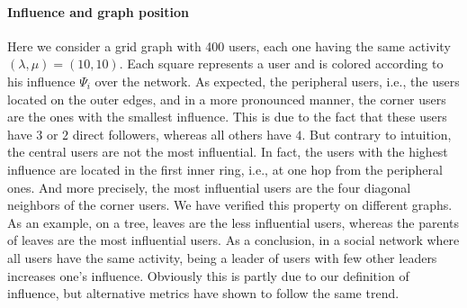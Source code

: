 \documentclass[10pt, conference, letterpaper]{IEEEtran}
\begin{document}
{\paragraph{Influence and graph position}
Here we consider a grid graph with 400 users, each one having the same activity $\left(\lambda, \mu\right) = \left(10, 10\right)$. Each square represents a user and is colored according to his influence $\Psi_i$ over the network.
As expected, the peripheral users, i.e., the users located on the outer edges, and in a more pronounced manner, the corner users are the ones with the smallest influence. This is due to the fact that these users have $3$ or $2$ direct followers, whereas all others have $4$. But contrary to intuition, the central users are not the most influential. In fact, the users with the highest influence are located in the first inner ring, i.e., at one hop from the peripheral ones. And more precisely, the most influential users are the four diagonal neighbors of the corner users. We have verified this property on different graphs. As an example, on a tree, leaves are the less influential users, whereas the parents of leaves are the most influential users. As a conclusion, in a social network where all users have the same activity, being a leader of users with few other leaders increases one's influence. Obviously this is partly due to our definition of influence, but alternative metrics have shown to follow the same trend.
	
}
\end{document}
